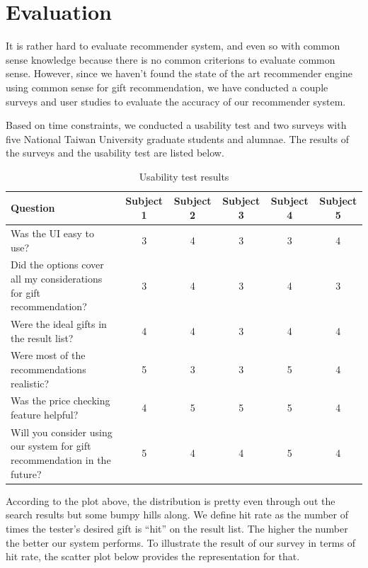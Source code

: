 \documentclass[11pt,twocolumn]{article}
\begin{document}
\section{Evaluation}
It is rather hard to evaluate recommender system, and even so with common sense knowledge because there is no
common criterions to evaluate common sense. However, since we haven't found the state of the art recommender engine
using common sense for gift recommendation, we have conducted a couple surveys and user studies to evaluate the accuracy
of our recommender system.

Based on time constraints, we conducted a usability test and two surveys with five National Taiwan University graduate students and alumnae.
The results of the surveys and the usability test are listed below.

\begin{table}[ht]
\caption{Usability test results}
\centering
\begin{tabular}{| p{5cm} | c | c | c | c | c |}
\hline
Question & Subject 1 & Subject 2 & Subject 3 & Subject 4 & Subject 5 \\
\hline
Was the UI easy to use? & 3 & 4 & 3 & 3 & 4 \\
\hline
Did the options cover all my considerations for gift recommendation? & 3 & 4 & 3 & 4 & 3 \\
\hline
Were the ideal gifts in the result list? & 4 & 4 & 3 & 4 & 4 \\
\hline
Were most of the recommendations realistic? & 5 & 3 & 3 & 5 & 4 \\
\hline
Was the price checking feature helpful? & 4 & 5 & 5 & 5 & 4 \\
\hline
Will you consider using our system for gift recommendation in the future? & 5 & 4 & 4 & 5 & 4 \\
\hline
\end{tabular}
\label{table:usetest}
\end{table}


According to the plot above, the distribution is pretty even through out the search results but some bumpy hills along. We define hit rate as the number of times the tester's desired gift is ``hit'' on the result list. The higher the number the better our system performs. To illustrate the result of our survey in terms of hit rate, the scatter plot below provides the representation for that.
\end{document}
